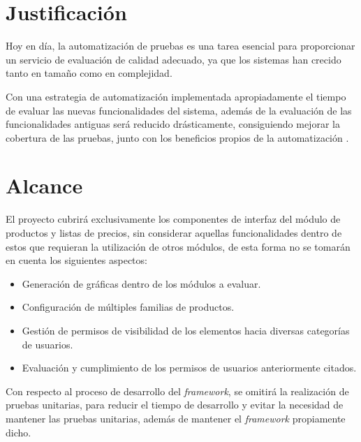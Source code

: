 \section{Justificación}
Hoy en día, la automatización de pruebas es una tarea esencial para proporcionar
un servicio de evaluación de calidad adecuado, ya que los sistemas han crecido
tanto en tamaño como en complejidad.

Con una estrategia de automatización implementada apropiadamente el tiempo de
evaluar las nuevas funcionalidades del sistema, además de la evaluación de las
funcionalidades antiguas será reducido drásticamente, consiguiendo mejorar la
cobertura de las pruebas, junto con los beneficios propios de la automatización
\parencite{Software}.

\section{Alcance}
El proyecto cubrirá exclusivamente los componentes de interfaz del módulo de
productos y listas de precios, sin considerar aquellas funcionalidades dentro de
estos que requieran la utilización de otros módulos, de esta forma no se tomarán
en cuenta los siguientes aspectos:

\begin{itemize}
\item Generación de gráficas dentro de los módulos a evaluar.
\item Configuración de múltiples familias de productos.
\item Gestión de permisos de visibilidad de los elementos hacia diversas
    categorías de usuarios.
\item Evaluación y cumplimiento de los permisos de usuarios anteriormente
    citados.
\end{itemize}

Con respecto al proceso de desarrollo del \emph{framework}, se omitirá la
realización de pruebas unitarias, para reducir el tiempo de desarrollo y evitar
la necesidad de mantener las pruebas unitarias, además de mantener el
\emph{framework} propiamente dicho.

